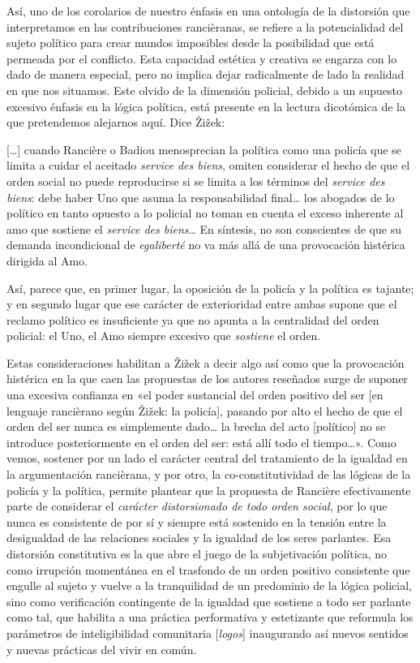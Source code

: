 Así, uno de los corolarios de nuestro énfasis en una ontología de la distorsión que interpretamos en las contribuciones rancièranas, se refiere a la potencialidad del sujeto político para crear mundos imposibles desde la posibilidad que está permeada por el conflicto. Esta capacidad estética y creativa se engarza con lo dado de manera especial, pero no implica dejar radicalmente de lado la realidad en que nos situamos. Este olvido de la dimensión policial, debido a un supuesto excesivo énfasis en la lógica política, está presente en la lectura dicotómica de la que pretendemos alejarnos aquí. Dice Žižek:

{[}\ldots{]} cuando Rancière o Badiou menosprecian la política como una policía que se limita a cuidar el aceitado \emph{service des biens}, omiten considerar el hecho de que el orden social no puede reproducirse si se limita a los términos del \emph{service des biens}: debe haber Uno que asuma la responsabilidad final\ldots{} los abogados de lo político en tanto opuesto a lo policial no toman en cuenta el exceso inherente al amo que sostiene el \emph{service des biens}\ldots{} En síntesis, no son conscientes de que su demanda incondicional de \emph{egaliberté} no va más allá de una provocación histérica dirigida al Amo.

Así, parece que, en primer lugar, la oposición de la policía y la política es tajante; y en segundo lugar que ese carácter de exterioridad entre ambas supone que el reclamo político es insuficiente ya que no apunta a la centralidad del orden policial: el Uno, el Amo siempre excesivo que \emph{sostiene} el orden.

Estas consideraciones habilitan a Žižek a decir algo así como que la provocación histérica en la que caen las propuestas de los autores reseñados surge de suponer una excesiva confianza en «el poder sustancial del orden positivo del ser {[}en lenguaje rancièrano según Žižek: la policía{]}, pasando por alto el hecho de que el orden del ser nunca es simplemente dado\ldots{} la brecha del acto {[}político{]} no se introduce posteriormente en el orden del ser: está allí todo el tiempo\ldots». Como vemos, sostener por un lado el carácter central del tratamiento de la igualdad en la argumentación rancièrana, y por otro, la co-constitutividad de las lógicas de la policía y la política, permite plantear que la propuesta de Rancière efectivamente parte de considerar el \emph{carácter distorsionado de todo orden social}, por lo que nunca es consistente de por sí y siempre está sostenido en la tensión entre la desigualdad de las relaciones sociales y la igualdad de los seres parlantes. Esa distorsión constitutiva es la que abre el juego de la subjetivación política, no como irrupción momentánea en el trasfondo de un orden positivo consistente que engulle al sujeto y vuelve a la tranquilidad de un predominio de la lógica policial, sino como verificación contingente de la igualdad que sostiene a todo ser parlante como tal, que habilita a una práctica performativa y estetizante que reformula los parámetros de inteligibilidad comunitaria {[}\emph{logos}{]} inaugurando así nuevos sentidos y nuevas prácticas del vivir en común.

